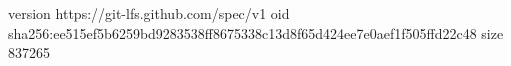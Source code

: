 version https://git-lfs.github.com/spec/v1
oid sha256:ee515ef5b6259bd9283538ff8675338c13d8f65d424ee7e0aef1f505ffd22c48
size 837265
